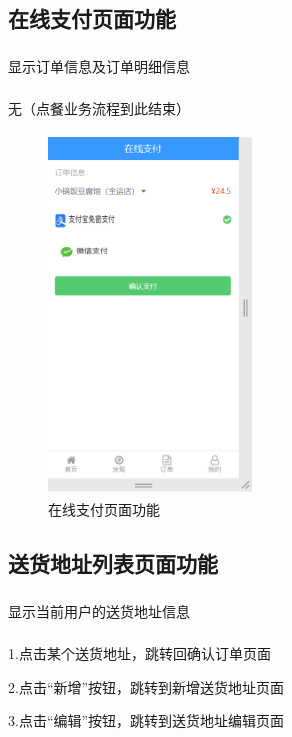 \subsection{在线支付页面功能}
\subsubsection*{}
显示订单信息及订单明细信息
\subsubsection*{}
无（点餐业务流程到此结束）
\begin{figure}[H]
    \centering
    \includegraphics[width=5.4cm,height=9.6cm]{figures/3.1.5.png}
    \caption{在线支付页面功能}
\end{figure}

\subsection{送货地址列表页面功能}
\subsubsection*{}
显示当前用户的送货地址信息
\subsubsection*{}
1.点击某个送货地址，跳转回确认订单页面

2.点击“新增”按钮，跳转到新增送货地址页面

3.点击“编辑”按钮，跳转到送货地址编辑页面


